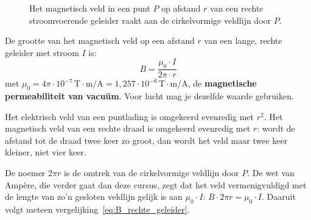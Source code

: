 \documentclass{ximera}
\begin{document}
\begin{figure}[ht!]
    \captionsetup{width=0.85\textwidth}
    \begin{center}
    \end{center}
    \caption{Het magnetisch veld in een punt $P$ op afstand $r$ van een rechte stroomvoerende geleider raakt aan de cirkelvormige veldlijn door $P$.}
    \label{fig:B_rechte_geleider}
\end{figure}

\begin{proposition}[foldable=true,title={Magnetisch veld bij een rechte stroomvoerende geleider}]\nl
    De grootte van het magnetisch veld op een afstand $r$ van een lange, rechte geleider met stroom $I$ is:
    \begin{equation}\label{eq:B_rechte_geleider}
        B = \frac{\mu_0 \cdot I}{2\pi \cdot r}
    \end{equation}
    met $\mu_0 = 4\pi \cdot 10^{-7}\,\mathrm{T\cdot m/A} = 1{,}257 \cdot 10^{-6}\,\mathrm{T\cdot m/A}$, de \textbf{magnetische permeabiliteit van vacuüm}. Voor lucht mag je dezelfde waarde gebruiken.
\end{proposition}

\begin{remark}[expandable=true,title={Vergelijk met een puntlading}]\nl
    Het elektrisch veld van een puntlading is omgekeerd evenredig met $r^2$. Het magnetisch veld van een rechte draad is omgekeerd evenredig met $r$: wordt de afstand tot de draad twee keer zo groot, dan wordt het veld maar twee keer kleiner, niet vier keer.
\end{remark}

\begin{remark}[expandable=true,title={Extra: waar komt de noemer van de formule vandaan?}]\nl
    De noemer $2\pi r$ is de omtrek van de cirkelvormige veldlijn door $P$. De wet van Ampère, die verder gaat dan deze cursus, zegt dat het veld vermenigvuldigd met de lengte van zo'n gesloten veldlijn gelijk is aan $\mu_0 \cdot I$: $B \cdot 2\pi r = \mu_0 \cdot I$. Daaruit volgt meteen vergelijking~\eqref{eq:B_rechte_geleider}.
\end{remark}
\end{document}
